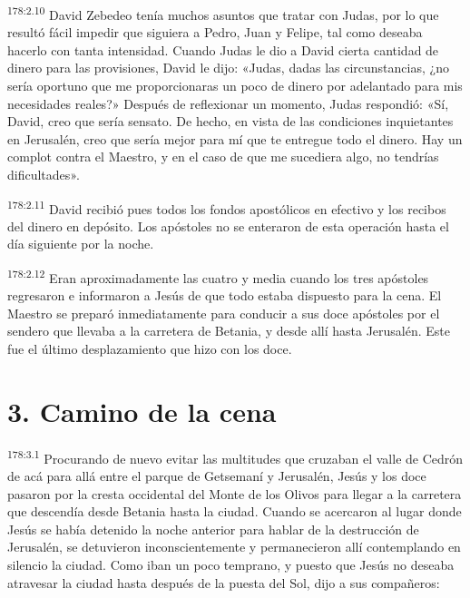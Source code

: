 \par 
\textsuperscript{178:2.10} David Zebedeo tenía muchos asuntos que tratar con Judas, por lo que resultó fácil impedir que siguiera a Pedro, Juan y Felipe, tal como deseaba hacerlo con tanta intensidad. Cuando Judas le dio a David cierta cantidad de dinero para las provisiones, David le dijo: «Judas, dadas las circunstancias, ¿no sería oportuno que me proporcionaras un poco de dinero por adelantado para mis necesidades reales?» Después de reflexionar un momento, Judas respondió: «Sí, David, creo que sería sensato. De hecho, en vista de las condiciones inquietantes en Jerusalén, creo que sería mejor para mí que te entregue todo el dinero. Hay un complot contra el Maestro, y en el caso de que me sucediera algo, no tendrías dificultades».

\par 
\textsuperscript{178:2.11} David recibió pues todos los fondos apostólicos en efectivo y los recibos del dinero en depósito. Los apóstoles no se enteraron de esta operación hasta el día siguiente por la noche.

\par 
\textsuperscript{178:2.12} Eran aproximadamente las cuatro y media cuando los tres apóstoles regresaron e informaron a Jesús de que todo estaba dispuesto para la cena. El Maestro se preparó inmediatamente para conducir a sus doce apóstoles por el sendero que llevaba a la carretera de Betania, y desde allí hasta Jerusalén. Este fue el último desplazamiento que hizo con los doce.

\section*{3. Camino de la cena}
\par 
\textsuperscript{178:3.1} Procurando de nuevo evitar las multitudes que cruzaban el valle de Cedrón de acá para allá entre el parque de Getsemaní y Jerusalén, Jesús y los doce pasaron por la cresta occidental del Monte de los Olivos para llegar a la carretera que descendía desde Betania hasta la ciudad. Cuando se acercaron al lugar donde Jesús se había detenido la noche anterior para hablar de la destrucción de Jerusalén, se detuvieron inconscientemente y permanecieron allí contemplando en silencio la ciudad. Como iban un poco temprano, y puesto que Jesús no deseaba atravesar la ciudad hasta después de la puesta del Sol, dijo a sus compañeros:

